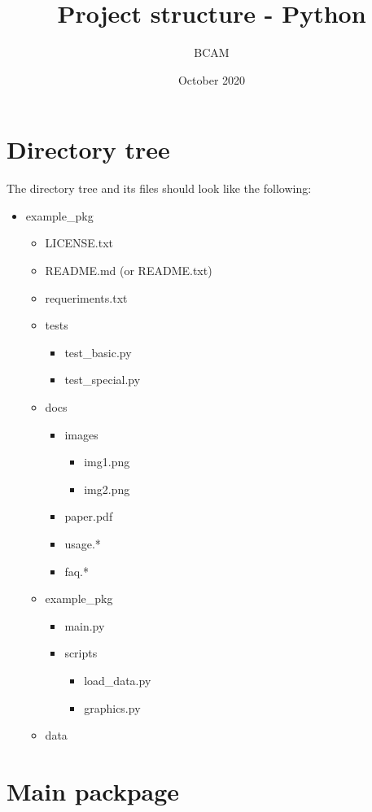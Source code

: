 \documentclass[a4paper]{article}
\title{Project structure - Python}
\date{October  2020}
\author{BCAM}
\begin{document}
	\maketitle
	\tableofcontents
	\section{Directory tree}
		The directory tree and its files should look like the following:\\
		\begin{itemize}
			\item example\_pkg
			\begin{itemize}
				\item LICENSE.txt
				\item README.md (or README.txt)
				\item requeriments.txt
				\item tests
				\begin{itemize}
					\item test\_basic.py
					\item test\_special.py
				\end{itemize}
				\item docs
				\begin{itemize}
					\item images
					\begin{itemize}
						\item img1.png
						\item img2.png
					\end{itemize}
					\item paper.pdf
					\item usage.*
					\item faq.*
				\end{itemize}
				\item example\_pkg
				\begin{itemize}
					\item main.py
					\item scripts
					\begin{itemize}
						\item load\_data.py
						\item graphics.py
					\end{itemize} 
				\end{itemize}
				\item data
			\end{itemize}
		\end{itemize}
	\section{Main packpage}
\end{document}
